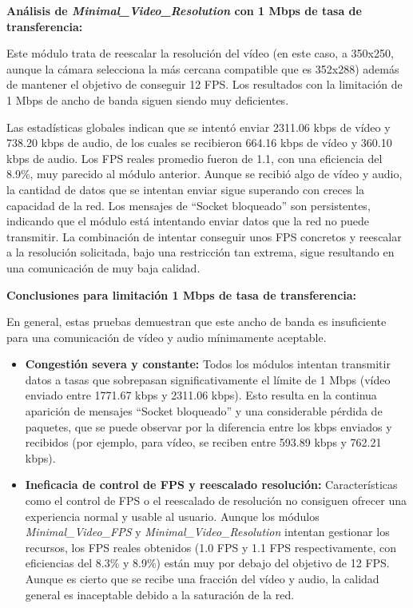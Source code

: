 \vspace{\baselineskip}

\textbf{Análisis de \textit{Minimal\_Video\_Resolution} con 1 Mbps de tasa de transferencia:}
\vspace{\baselineskip}

Este módulo trata de reescalar la resolución del vídeo (en este caso, a 350x250, aunque la cámara selecciona la más cercana compatible que es 352x288) además de mantener el objetivo de conseguir 12 FPS. Los resultados con la limitación de 1 Mbps de ancho de banda siguen siendo muy deficientes.
\vspace{\baselineskip}

Las estadísticas globales indican que se intentó enviar 2311.06 kbps de vídeo y 738.20 kbps de audio, de los cuales se recibieron 664.16 kbps de vídeo y 360.10 kbps de audio. Los FPS reales promedio fueron de 1.1, con una eficiencia del 8.9\%, muy parecido al módulo anterior. Aunque se recibió algo de vídeo y audio, la cantidad de datos que se intentan enviar sigue superando con creces la capacidad de la red. Los mensajes de ``Socket bloqueado'' son persistentes, indicando que el módulo está intentando enviar datos que la red no puede transmitir. La combinación de intentar conseguir unos FPS concretos y reescalar a la resolución solicitada, bajo una restricción tan extrema, sigue resultando en una comunicación de muy baja calidad.

\textbf{Conclusiones para limitación 1 Mbps de tasa de transferencia:}

En general, estas pruebas demuestran que este ancho de banda es insuficiente para una comunicación de vídeo y audio mínimamente aceptable.
\begin{itemize}
\item \textbf{Congestión severa y constante:} Todos los módulos intentan transmitir datos a tasas que sobrepasan significativamente el límite de 1 Mbps (vídeo enviado entre 1771.67 kbps y 2311.06 kbps). Esto resulta en la continua aparición de mensajes ``Socket bloqueado'' y una considerable pérdida de paquetes, que se puede observar por la diferencia entre los kbps enviados y recibidos (por ejemplo, para vídeo, se reciben entre 593.89 kbps y 762.21 kbps).
\item \textbf{Ineficacia de control de FPS y reescalado resolución:} Características como el control de FPS o el reescalado de resolución no consiguen ofrecer una experiencia normal y usable al usuario. Aunque los módulos \textit{Minimal\_Video\_FPS} y \textit{Minimal\_Video\_Resolution} intentan gestionar los recursos, los FPS reales obtenidos (1.0 FPS y 1.1 FPS respectivamente, con eficiencias del 8.3\% y 8.9\%) están muy por debajo del objetivo de 12 FPS. Aunque es cierto que se recibe una fracción del vídeo y audio, la calidad general es inaceptable debido a la saturación de la red.
\end{itemize}

